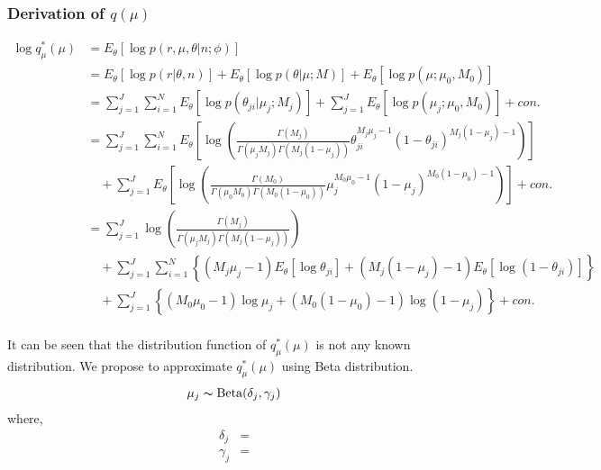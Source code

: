 \documentclass[11pt,reqno]{amsart}
\begin{document}
\subsubsection{Derivation of $ q(\mu) $}
\begin{equation}
\label{now}
\begin{split}
\log q_\mu^*(\mu) &= E_\theta\left[ \log p\left(r,\mu,\theta | n; \phi \right) \right] \\
&= E_\theta \left[ \log p\left(r | \theta, n \right)\right] + E_\theta \left[ \log p\left(\theta | \mu; M \right)\right] + E_\theta \left[ \log p\left(\mu ; \mu_0, M_0 \right)\right] \\
&= \sum_{j=1}^{J} \sum_{i=1}^{N} E_\theta \left[ \log p\left(\theta_{ji} | \mu_j; M_j \right)\right] + \sum_{j=1}^{J} E_\theta  \left[ \log p\left( \mu_j; \mu_0, M_0 \right) \right] + con.\\
&= \sum_{j=1}^{J} \sum_{i=1}^{N}  E_\theta  \left[ \log \left( \frac{ \Gamma(M_j) } { \Gamma(\mu_j M_j) \Gamma(M_j (1-\mu_j)) } \theta_{ji}^{M_j\mu_j -1} (1 - \theta_{ji})^{M_j ( 1 - \mu_j) - 1} \right) \right] \\
&\quad + \sum_{j=1}^{J} E_\theta  \left[ \log \left( \frac{ \Gamma(M_0) } { \Gamma(\mu_0 M_0) \Gamma(M_0 (1-\mu_0)) } \mu_j^{M_0\mu_0 -1} (1 - \mu_j)^{M_0 ( 1 - \mu_0) - 1} \right) \right] + con. \\
&= \sum_{j=1}^{J} \log \left( \frac{ \Gamma(M_j) } { \Gamma(\mu_j M_j) \Gamma(M_j (1-\mu_j)) }\right) \\
&\quad + \sum_{j=1}^{J} \sum_{i=1}^{N} \left\lbrace  \left( M_j\mu_j -1\right) E_\theta  \left[ \log \theta_{ji}\right] + \left( M_j ( 1 - \mu_j) - 1 \right)  E_\theta  \left[ \log \left( 1- \theta_{ji}\right) \right] \right\rbrace \\
&\quad + \sum_{j=1}^{J} \left\lbrace (M_0 \mu_0 - 1) \log \mu_j + (M_0 ( 1 - \mu_0) - 1) \log ( 1 - \mu_j)\right\rbrace  + con. \\
\end{split}
\end{equation}

It can be seen that the distribution function of $ q_\mu^*(\mu) $ is not any known distribution. We propose to approximate $ q_\mu^*(\mu) $ using Beta distribution.
\begin{align}
\mu_j \thicksim \text{Beta}(\delta_j, \gamma_j)
\end{align}
where,
\begin{align}
\delta_j &=  \nonumber \\
\gamma_j &=  \nonumber
\end{align}
\end{document}
